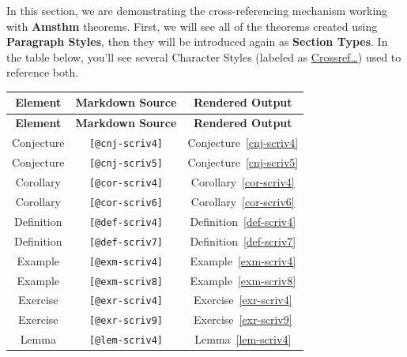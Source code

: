 \documentclass[
  12pt,
  a4paper,
  oneside,
  numbers=noenddot,
  titlepage,
  toclink=all,
  toc=bibliography]{scrbook}
\theoremstyle{definition}
\theoremstyle{definition}
\theoremstyle{definition}
\theoremstyle{plain}
\theoremstyle{plain}
\theoremstyle{plain}
\theoremstyle{plain}
\theoremstyle{plain}
\theoremstyle{remark}
\begin{document}
In this section, we are demonstrating the cross-referencing mechanism
working with \textbf{Amsthm} theorems. First, we will see all of the
theorems created using \textbf{Paragraph Styles}, then they will be
introduced again as \textbf{Section Types}. In the table below, you'll
see several Character Styles (labeled as \ul{Crossref\ldots{}}) used to
reference both.

\hypertarget{tbl-scriv4}{}
\begin{longtable}[]{@{}ccc@{}}
\toprule\noalign{}
\textbf{Element} & \textbf{Markdown Source} & \textbf{Rendered
Output} \\
\midrule\noalign{}
\endfirsthead
\toprule\noalign{}
\textbf{Element} & \textbf{Markdown Source} & \textbf{Rendered
Output} \\
\midrule\noalign{}
\endhead
\bottomrule\noalign{}
\endlastfoot
Conjecture & \texttt{{[}@cnj-scriv4{]}} &
\protect\hypertarget{cite_51}{}{\label{cite_51}Conjecture~\ref{cnj-scriv4}} \\
Conjecture & \texttt{{[}@cnj-scriv5{]}} &
\protect\hypertarget{cite_52}{}{\label{cite_52}Conjecture~\ref{cnj-scriv5}} \\
Corollary & \texttt{{[}@cor-scriv4{]}} &
\protect\hypertarget{cite_53}{}{\label{cite_53}Corollary~\ref{cor-scriv4}} \\
Corollary & \texttt{{[}@cor-scriv6{]}} &
\protect\hypertarget{cite_54}{}{\label{cite_54}Corollary~\ref{cor-scriv6}} \\
Definition & \texttt{{[}@def-scriv4{]}} &
\protect\hypertarget{cite_55}{}{\label{cite_55}Definition~\ref{def-scriv4}} \\
Definition & \texttt{{[}@def-scriv7{]}} &
\protect\hypertarget{cite_56}{}{\label{cite_56}Definition~\ref{def-scriv7}} \\
Example & \texttt{{[}@exm-scriv4{]}} &
\protect\hypertarget{cite_57}{}{\label{cite_57}Example~\ref{exm-scriv4}} \\
Example & \texttt{{[}@exm-scriv8{]}} &
\protect\hypertarget{cite_58}{}{\label{cite_58}Example~\ref{exm-scriv8}} \\
Exercise & \texttt{{[}@exr-scriv4{]}} &
\protect\hypertarget{cite_59}{}{\label{cite_59}Exercise~\ref{exr-scriv4}} \\
Exercise & \texttt{{[}@exr-scriv9{]}} &
\protect\hypertarget{cite_60}{}{\label{cite_60}Exercise~\ref{exr-scriv9}} \\
Lemma & \texttt{{[}@lem-scriv4{]}} &
\protect\hypertarget{cite_61}{}{\label{cite_61}Lemma~\ref{lem-scriv4}} \\

\end{longtable}
\end{document}
